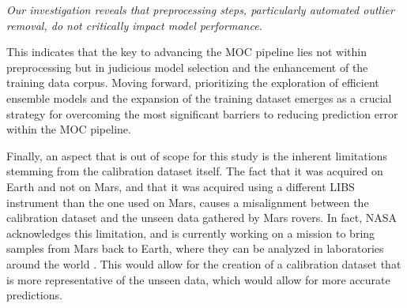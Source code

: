 \vspace{2mm}\noindent\textit{Our investigation reveals that preprocessing steps, particularly automated outlier removal, do not critically impact model performance.} 

\noindent
This indicates that the key to advancing the MOC pipeline lies not within preprocessing but in judicious model selection and the enhancement of the training data corpus.
Moving forward, prioritizing the exploration of efficient ensemble models and the expansion of the training dataset emerges as a crucial strategy for overcoming the most significant barriers to reducing prediction error within the MOC pipeline.

Finally, an aspect that is out of scope for this study is the inherent limitations stemming from the calibration dataset itself.
The fact that it was acquired on Earth and not on Mars, and that it was acquired using a different LIBS instrument than the one used on Mars, causes a misalignment between the calibration dataset and the unseen data gathered by Mars rovers.
In fact, NASA acknowledges this limitation, and is currently working on a mission to bring samples from Mars back to Earth, where they can be analyzed in laboratories around the world \cite{mars-sample-return}.
This would allow for the creation of a calibration dataset that is more representative of the unseen data, which would allow for more accurate predictions.